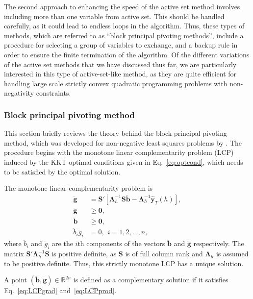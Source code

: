 \documentclass[11pt]{article}
\newcommand{\0}{\phantom{0}}
\begin{document}
The second approach to enhancing the speed of the active set method involves including more than one variable from active set. This should be handled carefully, as it could lead to endless loops in the algorithm. Thus, these types of methods, which are referred to  as ``block principal pivoting methods'', include a procedure for selecting a group of variables to exchange, and a backup rule in order to ensure the finite termination of the algorithm. Of the different variations of the active set methods that we have discussed thus far, we are particularly interested in this type of active-set-like method, as they are quite efficient for handling large scale strictly convex quadratic programming problems with non-negativity constraints.

\subsubsection{Block principal pivoting method}

This section briefly reviews the theory behind the block principal pivoting method, which was developed for non-negative least squares problems by \citet{Judice1994}. The procedure begins with the monotone linear complementarity problem (LCP) induced by the KKT optimal conditions given in Eq.~\eqref{eq:optcond}, which needs to be satisfied by the optimal solution.

The monotone linear complementarity problem is
\begin{align}
\ddot{\bm{g}} & = \bm{S}'[\bm{\Lambda}_{h}^{-1}\bm{S}\ddot{\bm{b}} - \bm{\Lambda}_{h}^{-1}\hat{\bm{y}}_{T}(h)],\label{eq:LCPgrad}\\
\ddot{\bm{g}} & \geq \bm{0}, \label{eq:LCPg}\\
\ddot{\bm{b}} & \geq \bm{0}, \label{eq:LCPb}\\
\ddot{b}_{i}\ddot{g}_{i} & = 0, \ \ i = 1, 2, \dots, n\label{eq:LCPprod},
\end{align}
where $\ddot{b}_{i}$ and $\ddot{g}_{i}$ are the $i$th components of the vectors $\ddot{\bm{b}}$ and $\ddot{\bm{g}}$ respectively. The matrix $\bm{S}'\bm{\Lambda}_{h}^{-1}\bm{S}$ is positive definite, as $\bm{S}$ is of full column rank and $\bm{\Lambda}_{h}$ is assumed to be positive definite. Thus, this strictly monotone LCP has a unique solution.

A point $(\ddot{\bm{b}}, \ddot{\bm{g}}) \in \mathbb{R}^{2n}$ is defined as a complementary solution if it satisfies Eq.~\eqref{eq:LCPgrad} and~\eqref{eq:LCPprod}.
\end{document}
